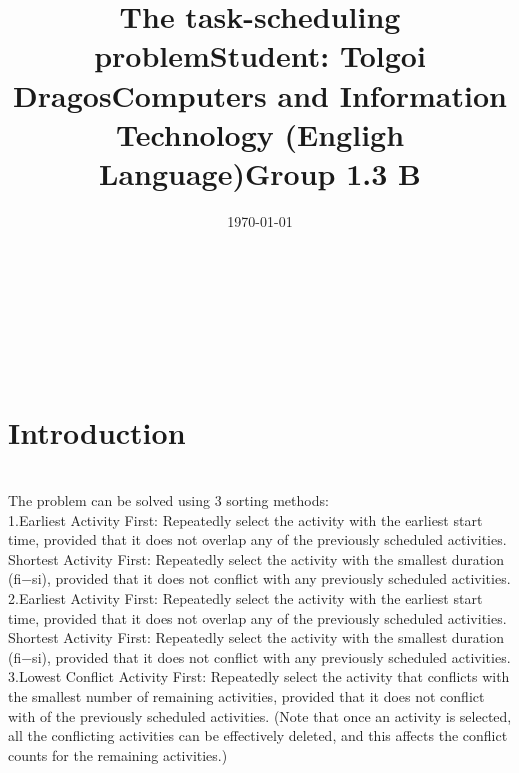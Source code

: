 \documentclass[14pt]{article}
\begin{document}
\title{\huge The task-scheduling problem}
\date{\today}
\maketitle
\begin{center}
\vspace{30 mm}

\title{\huge Student: Tolgoi Dragos}
\\\vspace{10 mm}
\title{\huge Computers and Information Technology (Engligh Language)}
\\\vspace{10 mm}
\title{\huge Group 1.3 B}
\\\vspace{10 mm}

\date{}
\maketitle

\newpage
\section*{Introduction}

\\\vspace{10 mm}
The problem can be solved using 3 sorting methods:
\\
1.Earliest Activity First: Repeatedly select the activity with the earliest start time, provided
that it does not overlap any of the previously scheduled activities.
Shortest Activity First: Repeatedly select the activity with the smallest duration (fi−si),
provided that it does not conflict with any previously scheduled activities.
\\
2.Earliest Activity First: Repeatedly select the activity with the earliest start time, provided
that it does not overlap any of the previously scheduled activities.
Shortest Activity First: Repeatedly select the activity with the smallest duration (fi−si),
provided that it does not conflict with any previously scheduled activities.
\\
3.Lowest Conflict Activity First: Repeatedly select the activity that conflicts with the
smallest number of remaining activities, provided that it does not conflict with of the
previously scheduled activities. (Note that once an activity is selected, all the conflicting
activities can be effectively deleted, and this affects the conflict counts for the remaining
activities.)
\newpage
\end{center}
\end{document}
